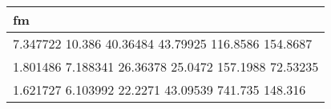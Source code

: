 \begin{tabular}{l}
fm \\ 
\hline 
7.347722        10.386      40.36484      43.79925      116.8586      154.8687 \\ 
1.801486      7.188341      26.36378       25.0472      157.1988      72.53235 \\ 
1.621727      6.103992       22.2271      43.09539       741.735       148.316 \\ 
\hline 
\end{tabular}